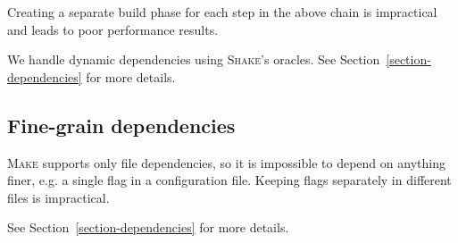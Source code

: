 \noindent Creating a separate build phase for each step in the above chain is
impractical and leads to poor performance results.

We handle dynamic dependencies using \textsc{Shake}'s oracles. See
Section~\ref{section-dependencies} for more details.

\subsection{Fine-grain dependencies}

\textsc{Make} supports only file dependencies, so it is impossible to depend
on anything finer, e.g. a single flag in a configuration file. Keeping flags
separately in different files is impractical. 

See Section~\ref{section-dependencies} for more details.
